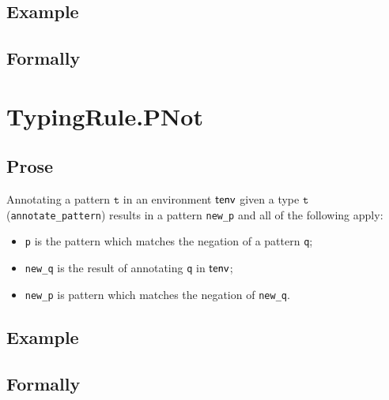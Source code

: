 \documentclass{book}
\newcommand\vt[0]{\texttt{t}}
\begin{document}
  \subsection{Example}



\begin{emptyformal}
    \subsection{Formally}
\end{emptyformal}


\section{TypingRule.PNot \label{sec:TypingRule.PNot}}

  \subsection{Prose}
   Annotating a pattern $\vt$ in an environment $\textsf{tenv}$ given a type $\vt$ (\texttt{annotate\_pattern}) results in a pattern \texttt{new\_p} and all of the following apply:
   \begin{itemize}
   \item \texttt{p} is the pattern which matches the negation of a pattern \texttt{q};
   \item \texttt{new\_q} is the result of annotating \texttt{q} in $\textsf{tenv}$;
   \item \texttt{new\_p} is pattern which matches the negation of \texttt{new\_q}.
   \end{itemize}

  \subsection{Example}



\begin{emptyformal}
    \subsection{Formally}
\end{emptyformal}
\end{document}
